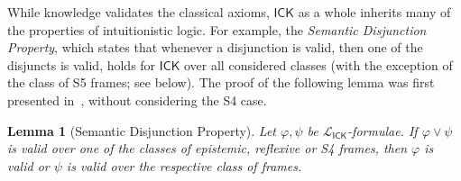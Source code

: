 \documentclass{myifcolog}
\newcommand{\ICK}{\mathsf{ICK}}
\newcommand{\LICK}{\mathcal{L}_{\ICK}}
\newtheorem{lemma}[theorem]{Lemma}
\numberwithin{theorem}{section}
\begin{document}
While knowledge validates the classical axioms, $\ICK$ as a whole inherits many of the properties of intuitionistic logic. For example, the \emph{Semantic Disjunction Property}, which states that whenever a disjunction is valid, then one of the disjuncts is valid, holds for $\ICK$ over all considered classes (with the exception of the class of S5 frames; see below). The proof of the following lemma was first presented in~\cite{marti_2017}, without considering the S4 case.

\begin{lemma}[Semantic Disjunction Property]\label{l: semantic disjunction property}
   Let $\varphi, \psi$ be $\LICK$-formulae. If $\varphi \vee \psi$ is valid over one of the classes of epistemic, reflexive or S4 frames, then $\varphi$ is valid or $\psi$ is valid over the respective class of frames.
\end{lemma}
\end{document}
